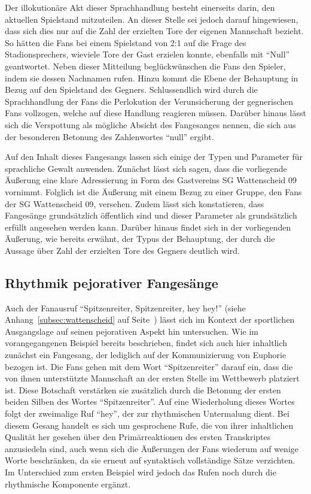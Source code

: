 Der illokutionäre Akt dieser Sprachhandlung besteht einerseits darin, den aktuellen Spielstand mitzuteilen.
An dieser Stelle sei jedoch darauf hingewiesen, dass sich dies nur auf die Zahl der erzielten Tore der eigenen Mannschaft bezieht.
So hätten die Fans bei einem Spielstand von 2:1 auf die Frage des Stadionsprechers, wieviele Tore der Gast erzielen konnte, ebenfalls mit "`Null"' geantwortet.
Neben dieser Mitteilung beglückwünschen die Fans den Spieler, indem sie dessen Nachnamen rufen.
Hinzu kommt die Ebene der Behauptung in Bezug auf den Spielstand des Gegners.
Schlussendlich wird durch die Sprachhandlung der Fans die Perlokution der Verunsicherung der gegnerischen Fans vollzogen, welche auf diese Handlung reagieren müssen.
Darüber hinaus lässt sich die Verspottung als mögliche Absicht des Fangesanges nennen, die sich aus der besonderen Betonung des Zahlenwortes "`null"' ergibt.

Auf den Inhalt dieses Fangesangs lassen sich einige der Typen und Parameter für sprachliche Gewalt anwenden.
Zunächst lässt sich sagen, dass die vorliegende Äußerung eine klare Adressierung in Form des Gastvereins SG Wattenscheid 09 vornimmt.
Folglich ist die Äußerung mit einem Bezug zu einer Gruppe, den Fans der SG Wattenscheid 09, versehen.
Zudem lässt sich konstatieren, dass Fangesänge grundsätzlich öffentlich sind und dieser Parameter als grundsätzlich erfüllt angesehen werden kann.
Darüber hinaus findet sich in der vorliegenden Äußerung, wie bereits erwähnt, der Typus der Behauptung, der durch die Aussage über Zahl der erzielten Tore des Gegners deutlich wird.

\subsection{Rhythmik pejorativer Fangesänge}
Auch der Fanausruf "`Spitzenreiter, Spitzenreiter, hey hey!"' (siehe Anhang~\ref{subsec:wattenscheid} auf Seite~\pageref{subsec:wattenscheid}) lässt sich im Kontext der sportlichen Ausgangslage auf seinen pejorativen Aspekt hin untersuchen.
Wie im vorangegangenen Beispiel bereits beschrieben, findet sich auch hier inhaltlich zunächst ein Fangesang, der lediglich auf der Kommunizierung von Euphorie bezogen ist.
Die Fans gehen mit dem Wort "`Spitzenreiter"' darauf ein, dass die von ihnen unterstützte Mannschaft an der ersten Stelle im Wettbewerb platziert ist.
Diese Botschaft verstärken sie zusätzlich durch die Betonung der ersten beiden Silben des Wortes "`Spitzenreiter"'.
Auf eine Wiederholung dieses Wortes folgt der zweimalige Ruf "`hey"', der zur rhythmischen Untermalung dient.
Bei diesem Gesang handelt es sich um gesprochene Rufe, die von ihrer inhaltlichen Qualität her gesehen über den Primärreaktionen des ersten Transkriptes anzusiedeln sind, auch wenn sich die Äußerungen der Fans wiederum auf wenige Worte beschränken, da sie erneut auf syntaktisch vollständige Sätze verzichten.
Im Unterschied zum ersten Beispiel wird jedoch das Rufen noch durch die rhythmische Komponente ergänzt.

